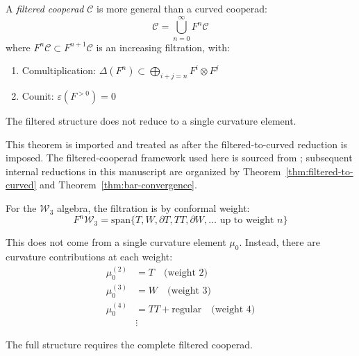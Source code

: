 \begin{theorem}
\label{thm:filtered-cooperads}
A \emph{filtered cooperad} $\mathcal{C}$ is more general than a curved cooperad:
\begin{equation}
\mathcal{C} = \bigcup_{n=0}^\infty F^n \mathcal{C}
\end{equation}
where $F^n \mathcal{C} \subset F^{n+1} \mathcal{C}$ is an increasing filtration, with:
\begin{enumerate}
\item Comultiplication: $\Delta(F^n) \subset \bigoplus_{i+j=n} F^i \otimes F^j$
\item Counit: $\varepsilon(F^{>0}) = 0$
\end{enumerate}

The filtered structure does not reduce to a single curvature element.
\end{theorem}

\begin{remark}
This theorem is imported and treated as \ClaimStatusConditional after
the filtered-to-curved reduction is imposed. The
filtered-cooperad framework used here is sourced from \cite{GLZ22}; subsequent
internal reductions in this manuscript are organized by
Theorem~\ref{thm:filtered-to-curved} and Theorem~\ref{thm:bar-convergence}.
\end{remark}

\begin{example}
\label{ex:w-algebra-filtered-comprehensive}
For the $\mathcal{W}_3$ algebra, the filtration is by conformal weight:
\begin{equation}
F^n \mathcal{W}_3 = \text{span}\{T, W, \partial T, TT, \partial W, \ldots \text{ up to
weight } n\}
\end{equation}

This does not come from a single curvature element $\mu_0$. Instead, there are curvature
contributions at each weight:
\begin{align}
\mu_0^{(2)} &= T \quad \text{(weight 2)}\\
\mu_0^{(3)} &= W \quad \text{(weight 3)}\\
\mu_0^{(4)} &= TT + \text{regular} \quad \text{(weight 4)}\\
&\vdots
\end{align}

The full structure requires the complete filtered cooperad.
\end{example}

